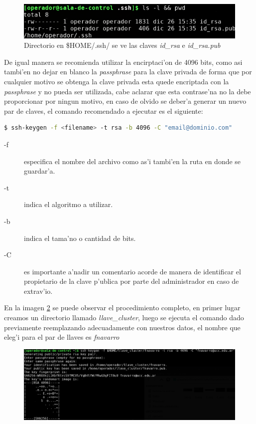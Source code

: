 \documentclass[a4paper]{scrartcl}
\begin{document}
\begin{figure}[ht]
  \includegraphics[scale=0.5]{./ssh_intro_imgs/B}
  \caption{Directorio en \$HOME/.ssh/ se ve las claves \textit{id\_rsa} e \textit{id\_rsa.pub}}
  \label{fig:2}
\end{figure}

De igual manera se recomienda utilizar la encirptaci'on de 4096 bits, como asi tambi'en no dejar en blanco la \textit{passphrase} para la clave privada de forma que por cualquier motivo se obtenga la clave privada esta quede encriptada con la \textit{passphrase} y no pueda ser utilizada, cabe aclarar que esta contrase'na no la debe proporcionar por ningun motivo, en caso de olvido se deber'a generar un nuevo par de claves, el comando recomendado a ejecutar es el siguiente:
\begin{lstlisting}[language=bash]
$ ssh-keygen -f <filename> -t rsa -b 4096 -C "email@dominio.com"
\end{lstlisting}

\begin{description}
	\item[-f] especifica el nombre del archivo como as'i tambi'en la ruta en donde se guardar'a.
	\item[-t] indica el algoritmo a utilizar.
	\item[-b] indica el tama'no o cantidad de bits.
	\item[-C] es importante a'nadir un comentario acorde de manera de identificar el propietario de la clave p'ublica por parte del administrador en caso de extrav'io.
\end{description}
En la imagen {\color{blue}\ref{fig:3}} se puede observar el procedimiento completo, en primer lugar creamos un directorio llamado \textit{llave\_cluster}, luego se ejecuta el comando dado previamente reemplazando adecuadamente con nuestros datos, el nombre que eleg'i para el par de llaves es \textit{fnavarro}
\begin{figure}[!ht]
  \includegraphics[scale=0.38]{./ssh_intro_imgs/C}
  \caption{}
  \label{fig:3}
\end{figure}
\end{document}
